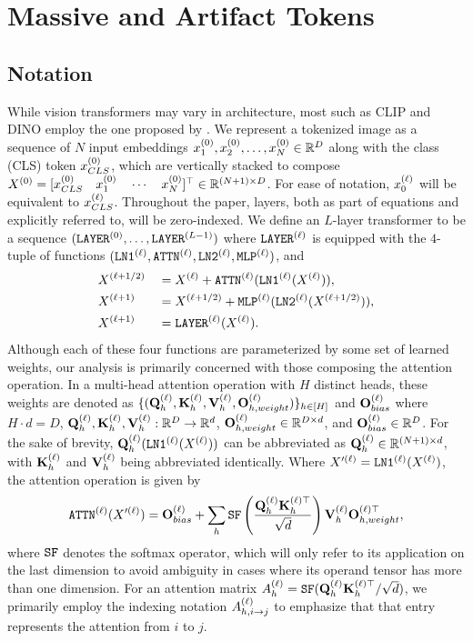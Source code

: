 \section{Massive and Artifact Tokens}
\label{sec:artifact_tokens}



\subsection{Notation}
While vision transformers may vary in architecture, most such as CLIP and DINO employ the one proposed by \cite{dosovitskiy2021vit}. We represent a tokenized image as a sequence of $N$ input embeddings $\emb{0}{1}, \emb{0}{2}, \ldots, \emb{0}{N} \in \R^D$ along with the class (CLS) token $\emb{0}{CLS}$, which are vertically stacked to compose $\Emb{0} = \tr{[\emb{0}{CLS} \quad \emb{0}{1} \quad \cdots \quad \emb{0}{N}]} \in \R^{(N + 1) \times D}$. For ease of notation, $\emb{\ell}{0}$ will be equivalent to $\emb{\ell}{CLS}$. Throughout the paper, layers, both as part of equations and explicitly referred to, will be zero-indexed. We define an $L$-layer transformer to be a sequence $(\lyr{0}, \ldots, \lyr{L - 1})$ where $\lyr{\ell}$ is equipped with the $4$-tuple of functions $(\lyn{1}{\ell}, \attn{\ell}, \lyn{2}{\ell}, \mlp{\ell})$, and \begin{alignat}{3}
    & \Emb{\ell + 1/2}  && = \Emb{\ell} + \attn{\ell}(\lyn{1}{\ell}(\Emb{\ell})), \label{eqn:layer}   \\
    & \Emb{\ell + 1}    && = \Emb{\ell + 1/2} + \mlp{\ell}(\lyn{2}{\ell}(\Emb{\ell + 1/2})), \\
    & \Emb{\ell + 1}    && = \lyr{\ell}(\Emb{\ell}).
\end{alignat} Although each of these four functions are parameterized by some set of learned weights, our analysis is primarily concerned with those composing the attention operation. In a multi-head attention operation with $H$ distinct heads, these weights are denoted as $\cbn{(\Ql{\ell}_h, \Kl{\ell}_h, \Vl{\ell}_h, \Olw{\ell}{h})}_{h \in [H]}$ and $\Olb{\ell}$ where $H \cdot d = D$, $\Ql{\ell}_h, \Kl{\ell}_h, \Vl{\ell}_h: \R^D \to \R^{d}$, $\Olw{\ell}{h} \in \R^{D \times d}$, and $\Olb{\ell} \in \R^D$. For the sake of brevity, $\Ql{\ell}_h(\lyn{1}{\ell}(\Emb{\ell}))$ can be abbreviated as $\Ql{\ell}_h \in \R^{(N + 1) \times d}$, with $\Kl{\ell}_h$ and $\Vl{\ell}_h$ being abbreviated identically. Where $\Embp{\ell} = \lyn{1}{\ell}(\Emb{\ell})$, the attention operation is given by \begin{align}
    \attn{\ell}(\Embp{\ell}) = \Olb{\ell} + \dss{h}{} \sf\pfrac{\Ql{\ell}_h{\mbf{K}^{(\ell)\top}_h}}{\sqrt{d}}\Vl{\ell}_h{\mbf{O}^{(\ell)\top}_{h, weight}}, \label{eqn:attn}
\end{align} where $\sf$ denotes the softmax operator, which will only refer to its application on the last dimension to avoid ambiguity in cases where its operand tensor has more than one dimension. For an attention matrix $\Al{\ell}_h = \sf(\Ql{\ell}_h{\mbf{K}^{(\ell)\top}_h} / \sqrt{d})$, we primarily employ the indexing notation $\Al{\ell}_{h, i \to j}$ to emphasize that that entry represents the attention from $i$ to $j$.





